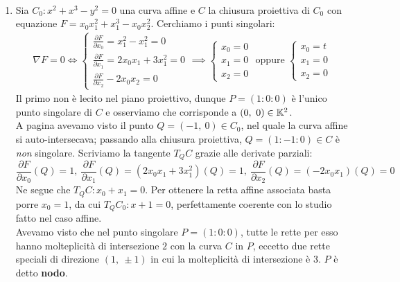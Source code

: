 \begin{examples}~{} \label{esempi lez 35}
	\begin{enumerate}
		\item	Sia $C_0\colon x^2+x^3-y^2=0$ una curva affine e $C$ la chiusura proiettiva di $C_0$ con equazione $F=x_0x_1^2+x_1^3-x_0x_2^2$. Cerchiamo i punti singolari:
			\begin{gather*}
				\nabla F=0 \iff \begin{cases}
					\frac{\partial{F}}{\partial{x_0}}=x_1^2 - x_1^2=0\\
					\frac{\partial{F}}{\partial{x_1}}=2x_0x_1+3x_1^2=0\\
					\frac{\partial{F}}{\partial{x_2}}-2x_0x_2=0
				\end{cases} \implies \begin{cases}
					x_0=0 \\ x_1=0 \\ x_2=0
				\end{cases} \text{ oppure } \begin{cases}
					x_0=t \\ x_1=0 \\ x_2=0
				\end{cases}
			\end{gather*}
		Il primo non è lecito nel piano proiettivo, dunque $P=(1\colon 0\colon 0)$ è l'unico punto singolare di $C$ e osserviamo che corrisponde a $(0,\ 0)\in\kamp^2$.\\
		A pagina \pageref{esempiocurvaq} avevamo visto il punto $Q=(-1,\ 0)\in C_0$, nel quale la curva affine si auto-intersecava; passando alla chiusura proiettiva, $Q=(1\colon -1\colon 0)\in C$ è \textit{non} singolare. Scriviamo la tangente $T_Q C$ grazie alle derivate parziali:
		\begin{equation*}
			\frac{\partial{F}}{\partial{x_0}}\left(Q\right)=1,\ \frac{\partial{F}}{\partial{x_1}}\left(Q\right)=(2x_0x_1+3x_1^2)\left(Q\right)=1,\ \frac{\partial{F}}{\partial{x_2}}\left(Q\right)=(-2x_0x_1)\left(Q\right)=0
		\end{equation*}
		Ne segue che $T_Q C\colon x_0+x_1=0$. Per ottenere la retta affine associata basta porre $x_0=1$, da cui $T_Q C_0\colon x+1=0$, perfettamente coerente con lo studio fatto nel caso affine.\\
		Avevamo visto che nel punto singolare $P=(1\colon 0\colon 0)$, tutte le rette per esso hanno molteplicità di intersezione $2$ con la curva $C$ in $P$, eccetto due rette speciali di direzione $(1,\ \pm 1)$ in cui la molteplicità di intersezione è 3. $P$ è detto \textbf{nodo}.

\end{enumerate}
\end{examples}
